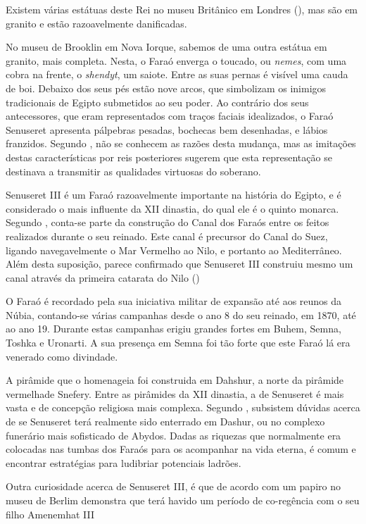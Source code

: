\documentclass{article}
\begin{document}
Existem várias estátuas deste Rei no museu Britânico em Londres
(\cite{wiki-senuseret}), mas são em granito e estão razoavelmente
danificadas.

No museu de Brooklin em Nova Iorque, sabemos de uma outra estátua em
granito, mais completa. Nesta, o Faraó enverga o toucado, ou
\emph{nemes}, com uma cobra na frente, o \emph{shendyt}, um
saiote. Entre as suas pernas é visível uma cauda de boi. Debaixo dos
seus pés estão nove arcos, que simbolizam os inimigos tradicionais de
Egipto submetidos ao seu poder. Ao contrário dos seus antecessores,
que eram representados com traços faciais idealizados, o Faraó
Senuseret apresenta pálpebras pesadas, bochecas bem desenhadas, e
lábios franzidos. Segundo \cite{wiki-senuseret}, não se conhecem as
razões desta mudança, mas as imitações destas características por reis
posteriores sugerem que esta representação se destinava a transmitir
as qualidades virtuosas do soberano.

Senuseret III é um Faraó razoavelmente importante na história do
Egipto, e é considerado o mais influente da XII dinastia, do qual ele
é o quinto monarca. Segundo \cite{wiki-senuseret}, conta-se parte da
construção do Canal dos Faraós entre os feitos realizados durante o
seu reinado. Este canal é precursor do Canal do Suez, ligando
navegavelmente o Mar Vermelho ao Nilo, e portanto ao
Mediterrâneo. Além desta suposição, parece confirmado que Senuseret
III construiu mesmo um canal através da primeira catarata do Nilo
(\cite{wiki-breasted})

O Faraó é recordado pela sua iniciativa militar de expansão até aos
reunos da Núbia, contando-se várias campanhas desde o ano 8 do seu
reinado, em 1870, até ao ano 19. Durante estas campanhas erigiu
grandes fortes em Buhem, Semna, Toshka e Uronarti. A sua presença em
Semna foi tão forte que este Faraó lá era venerado como divindade.

A pirâmide que o homenageia foi construida em Dahshur, a norte da
pirâmide vermelhade Snefery. Entre as pirâmides da XII dinastia, a de
Senuseret é mais vasta e de concepção religiosa mais complexa. Segundo
\cite{wiki-wegner}, subsistem dúvidas acerca de se Senuseret terá
realmente sido enterrado em Dashur, ou no complexo funerário mais
sofisticado de Abydos. Dadas as riquezas que normalmente era colocadas
nas tumbas dos Faraós para os acompanhar na vida eterna, é comum e
encontrar estratégias para ludibriar potenciais ladrões.

Outra curiosidade acerca de Senuseret III, é que de acordo com
\cite{wiki-wegner} um papiro no museu de Berlim demonstra que terá
havido um período de co-regência com o seu filho Amenemhat III
\end{document}
